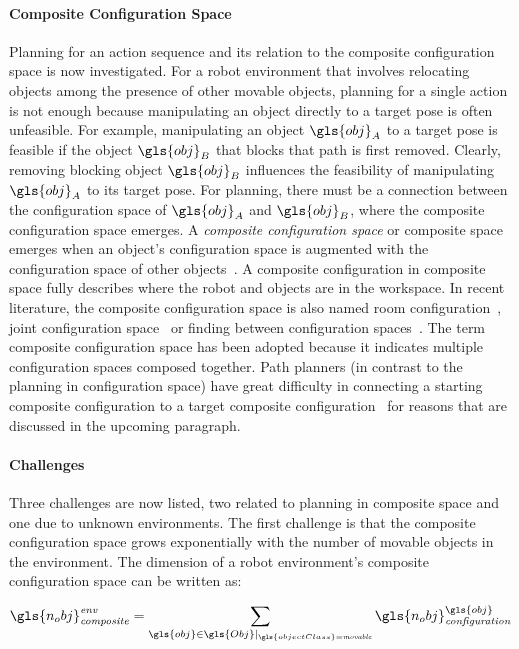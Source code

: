 \paragraph{Composite Configuration Space}
Planning for an action sequence and its relation to the composite configuration space is now investigated. For a robot environment that involves relocating objects among the presence of other movable objects, planning for a single action is not enough because manipulating an object directly to a target pose is often unfeasible. For example, manipulating an object $\gls{obj}_A$ to a target pose is feasible if the object $\gls{obj}_B$ that blocks that path is first removed. Clearly, removing blocking object $\gls{obj}_B$ influences the feasibility of manipulating $\gls{obj}_A$ to its target pose. For planning, there must be a connection between the configuration space of $\gls{obj}_A$ and $\gls{obj}_B$, where the composite configuration space emerges. A \textit{composite configuration space} or composite space emerges when an object's configuration space is augmented with the configuration space of other objects~\cite{vandenberg_path_2009,vega-brown_asymptotically_2020}. A composite configuration in composite space fully describes where the robot and objects are in the workspace. In recent literature, the composite configuration space is also named room configuration~\cite{sabbaghnovin_model_2021}, joint configuration space~\cite{vega-brown_asymptotically_2020} or finding  between configuration spaces~\cite{hauser_multimodal_2010}. The term composite configuration space has been adopted because it indicates multiple configuration spaces composed together. Path planners (in contrast to the planning in configuration space) have great difficulty in connecting a starting composite configuration to a target composite configuration~\cite{roynicholas_hierarchy_2021} for reasons that are discussed in the upcoming paragraph.\bs

\paragraph{Challenges}
Three challenges are now listed, two related to planning in composite space and one due to unknown environments. The first challenge is that the composite configuration space grows exponentially with the number of movable objects in the environment. The dimension of a robot environment's composite configuration space can be written as:

\[ \gls{n_obj}_\mathit{composite}^\mathit{env} = \sum_{\gls{obj} \in \gls{Obj} |_{\gls{objectClass} = \mathit{movable}}} \gls{n_obj}^{\gls{obj}}_\mathit{configuration} \]

